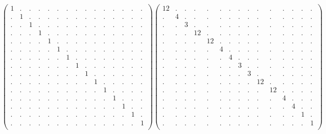 \documentclass[12pt,a4paper]{amsart}
\begin{document}
\begin{align*}
\left(\begin{array}{rrrrrrrrrrrrrrr}%
1&.&.&.&.&.&.&.&.&.&.&.&.&.&.\\%
.&1&.&.&.&.&.&.&.&.&.&.&.&.&.\\%
.&.&1&.&.&.&.&.&.&.&.&.&.&.&.\\%
.&.&.&1&.&.&.&.&.&.&.&.&.&.&.\\%
.&.&.&.&1&.&.&.&.&.&.&.&.&.&.\\%
.&.&.&.&.&1&.&.&.&.&.&.&.&.&.\\%
.&.&.&.&.&.&1&.&.&.&.&.&.&.&.\\%
.&.&.&.&.&.&.&1&.&.&.&.&.&.&.\\%
.&.&.&.&.&.&.&.&1&.&.&.&.&.&.\\%
.&.&.&.&.&.&.&.&.&1&.&.&.&.&.\\%
.&.&.&.&.&.&.&.&.&.&1&.&.&.&.\\%
.&.&.&.&.&.&.&.&.&.&.&1&.&.&.\\%
.&.&.&.&.&.&.&.&.&.&.&.&1&.&.\\%
.&.&.&.&.&.&.&.&.&.&.&.&.&1&.\\%
.&.&.&.&.&.&.&.&.&.&.&.&.&.&1\\%
\end{array}\right)%
\left(\begin{array}{rrrrrrrrrrrrrrr}%
12&.&.&.&.&.&.&.&.&.&.&.&.&.&.\\%
.&4&.&.&.&.&.&.&.&.&.&.&.&.&.\\%
.&.&3&.&.&.&.&.&.&.&.&.&.&.&.\\%
.&.&.&12&.&.&.&.&.&.&.&.&.&.&.\\%
.&.&.&.&12&.&.&.&.&.&.&.&.&.&.\\%
.&.&.&.&.&4&.&.&.&.&.&.&.&.&.\\%
.&.&.&.&.&.&4&.&.&.&.&.&.&.&.\\%
.&.&.&.&.&.&.&3&.&.&.&.&.&.&.\\%
.&.&.&.&.&.&.&.&3&.&.&.&.&.&.\\%
.&.&.&.&.&.&.&.&.&12&.&.&.&.&.\\%
.&.&.&.&.&.&.&.&.&.&12&.&.&.&.\\%
.&.&.&.&.&.&.&.&.&.&.&4&.&.&.\\%
.&.&.&.&.&.&.&.&.&.&.&.&4&.&.\\%
.&.&.&.&.&.&.&.&.&.&.&.&.&1&.\\%
.&.&.&.&.&.&.&.&.&.&.&.&.&.&1\\%
\end{array}\right)%
\end{align*}
\end{document}
